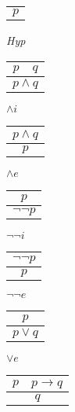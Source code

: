 \documentclass{article}
\begin{document}
\begin{center}
\begin{multicols}{3}

	\begin{tabular}{c}
	
		\\
		\hline
		$p$\\

	\end{tabular}
	\textit{Hyp}

	\begin{tabular}{c c}
	
		$p$ & $q$\\
		\hline
		\multicolumn{2}{c}{$p \land q$} \\

	\end{tabular}
	$\land i$

	\begin{tabular}{c}
	
		$p \land q$\\
		\hline
		$p$\\

	\end{tabular}
	$\land e$

	\begin{tabular}{c}
	
		$p$\\
		\hline
		$\neg \neg p$\\

	\end{tabular}
	$\neg \neg i$

	\begin{tabular}{c}
	
		$\neg \neg p$\\
		\hline
		$p$\\

	\end{tabular}
	$\neg \neg e$

	\begin{tabular}{c}
	
		$p$\\
		\hline
		$p \lor q$\\

	\end{tabular}
	$\lor e$

	\begin{tabular}{c c}
	
		$p$ & $p \longrightarrow q$\\
		\hline
		\multicolumn{2}{c}{$q$} \\


\end{tabular}
\end{multicols}
\end{center}
\end{document}
